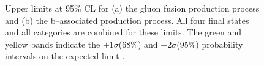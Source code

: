 \begin{figure}[h!]
\begin{center}
\end{center}
\caption[Upper limits at 95\% CL for the gluon fusion and b-associated production process.]{Upper limits at 95\% CL for (a) the gluon fusion production
process and (b) the b--associated production process. All four final states and 
all categories are combined for these limits. The green and yellow bands indicate
the $\pm 1\sigma$(68\%) and $\pm 2\sigma$(95\%) probability intervals on the expected limit  \cite{CMS-PAS-HIG-16-006}.}
\label{fig:mssm_results_hig16006_limits}
\end{figure}

